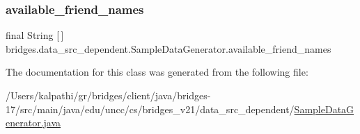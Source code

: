 \subsubsection{\texorpdfstring{available\+\_\+friend\+\_\+names}{available\_friend\_names}}
{\footnotesize\ttfamily final String \mbox{[}$\,$\mbox{]} bridges.\+data\+\_\+src\+\_\+dependent.\+Sample\+Data\+Generator.\+available\+\_\+friend\+\_\+names\hspace{0.3cm}{\ttfamily [static]}}



The documentation for this class was generated from the following file\+:\begin{DoxyCompactItemize}
\item 
/\+Users/kalpathi/gr/bridges/client/java/bridges-\/17/src/main/java/edu/uncc/cs/bridges\+\_\+v21/data\+\_\+src\+\_\+dependent/\mbox{\hyperlink{_sample_data_generator_8java}{Sample\+Data\+Generator.\+java}}\end{DoxyCompactItemize}
